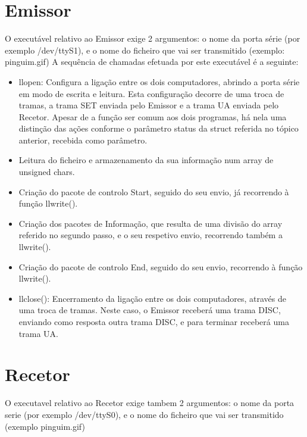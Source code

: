 \documentclass[article, a4paper, 11pt, oneside]{memoir}
\begin{document}
\section{Emissor}
O executável relativo ao Emissor exige 2 argumentos: o nome da porta série (por exemplo /dev/ttyS1), e o nome do ficheiro que vai ser transmitido (exemplo: pinguim.gif)
A sequência de chamadas efetuada por este executável é a seguinte:
\begin{itemize}
	\item llopen: Configura a ligação entre os dois computadores, abrindo a porta série em modo de escrita e leitura. Esta configuração decorre de uma troca de tramas, a trama SET enviada pelo Emissor e a trama UA enviada pelo Recetor. Apesar de a função ser comum aos dois programas, há nela uma distinção das ações conforme o parâmetro status da struct referida no tópico anterior, recebida como parâmetro.
	\item Leitura do ficheiro e armazenamento da sua informação num array de unsigned chars.
	\item Criação do pacote de controlo Start, seguido do seu envio, já recorrendo à função llwrite().
	\item Criação dos pacotes de Informação, que resulta de uma divisão do array referido no segundo passo, e o seu respetivo envio, recorrendo também a llwrite().
	\item Criação do pacote de controlo End, seguido do seu envio, recorrendo à função llwrite().
	\item llclose(): Encerramento da ligação entre os dois computadores, através de uma troca de tramas. Neste caso, o Emissor receberá uma trama DISC, enviando como resposta outra trama DISC, e para terminar receberá uma trama UA.
\end{itemize}

\section{Recetor}
O executavel relativo ao Recetor exige tambem 2 argumentos: o nome da porta serie (por exemplo /dev/ttyS0), e o nome do ficheiro que vai ser transmitido (exemplo pinguim.gif)
 
\end{document}
